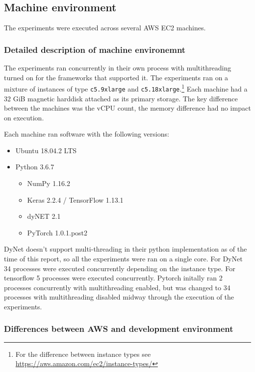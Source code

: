 \subsection{Machine environment}

The experiments were executed across several AWS EC2 machines.

\subsubsection{Detailed description of machine environemnt}

The experiments ran concurrently in their own process with multithreading
turned on for the frameworks that supported it. The experiments ran on a
mixture of instances of type \texttt{c5.9xlarge} and
\texttt{c5.18xlarge}.\footnote{For the difference between instance types see
\url{https://aws.amazon.com/ec2/instance-types/}}
Each machine had a 32 GiB magnetic harddisk attached as its primary storage.
The key difference between the machines was the vCPU count, the memory
difference had no impact on execution.

Each machine ran software with the following versions:
\begin{itemize}
  \item{Ubuntu 18.04.2 LTS}
  \item{Python 3.6.7}
  \begin{itemize}
    \item{NumPy 1.16.2}
    \item{Keras 2.2.4 / TensorFlow 1.13.1}
    \item{dyNET 2.1}
    \item{PyTorch 1.0.1.post2}
  \end{itemize}
\end{itemize}

DyNet doesn't support multi-threading in their python implementation as of the
time of this report, so all the experiments were ran on a single core. 
For DyNet 34 processes were executed concurrently depending on the
instance type.
For tensorflow 5 processes were executed concurrently.
Pytorch initally ran 2 processes concurrently with multithreading enabled, but
was changed to 34 processes with multithreading disabled midway through the
execution of the experiments.

\subsubsection{Differences between AWS and development environment}

